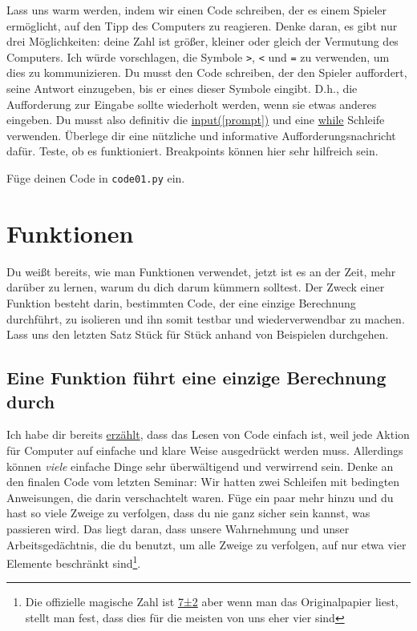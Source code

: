 \documentclass[
]{book}
\begin{document}
Lass uns warm werden, indem wir einen Code schreiben, der es einem Spieler ermöglicht, auf den Tipp des Computers zu reagieren. Denke daran, es gibt nur drei Möglichkeiten: deine Zahl ist größer, kleiner oder gleich der Vermutung des Computers. Ich würde vorschlagen, die Symbole \texttt{\textgreater{}}, \texttt{\textless{}} und \texttt{=} zu verwenden, um dies zu kommunizieren. Du musst den Code schreiben, der den Spieler auffordert, seine Antwort einzugeben, bis er eines dieser Symbole eingibt. D.h., die Aufforderung zur Eingabe sollte wiederholt werden, wenn sie etwas anderes eingeben. Du musst also definitiv die \href{https://docs.python.org/3/library/functions.html\#input}{input({[}prompt{]})} und eine \protect\hyperlink{while-loop}{while} Schleife verwenden. Überlege dir eine nützliche und informative Aufforderungsnachricht dafür. Teste, ob es funktioniert. Breakpoints können hier sehr hilfreich sein.

Füge deinen Code in \texttt{code01.py} ein.

\hypertarget{function}{%
\section{Funktionen}\label{function}}

Du weißt bereits, wie man Funktionen verwendet, jetzt ist es an der Zeit, mehr darüber zu lernen, warum du dich darum kümmern solltest. Der Zweck einer Funktion besteht darin, bestimmten Code, der eine einzige Berechnung durchführt, zu isolieren und ihn somit testbar und wiederverwendbar zu machen. Lass uns den letzten Satz Stück für Stück anhand von Beispielen durchgehen.

\hypertarget{eine-funktion-fuxfchrt-eine-einzige-berechnung-durch}{%
\subsection{Eine Funktion führt eine einzige Berechnung durch}\label{eine-funktion-fuxfchrt-eine-einzige-berechnung-durch}}

Ich habe dir bereits \protect\hyperlink{programming-tips}{erzählt}, dass das Lesen von Code einfach ist, weil jede Aktion für Computer auf einfache und klare Weise ausgedrückt werden muss. Allerdings können \emph{viele} einfache Dinge sehr überwältigend und verwirrend sein. Denke an den finalen Code vom letzten Seminar: Wir hatten zwei Schleifen mit bedingten Anweisungen, die darin verschachtelt waren. Füge ein paar mehr hinzu und du hast so viele Zweige zu verfolgen, dass du nie ganz sicher sein kannst, was passieren wird. Das liegt daran, dass unsere Wahrnehmung und unser Arbeitsgedächtnis, die du benutzt, um alle Zweige zu verfolgen, auf nur etwa vier Elemente beschränkt sind\footnote{Die offizielle magische Zahl ist \href{https://de.wikipedia.org/wiki/Magische_Zahl_7_plus_oder_minus_2}{7±2} aber wenn man das Originalpapier liest, stellt man fest, dass dies für die meisten von uns eher vier sind}.
\end{document}
